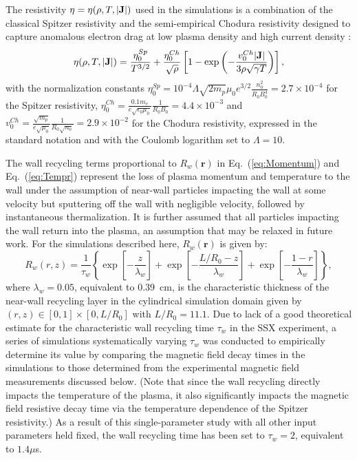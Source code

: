 The resistivity $\eta=\eta(\rho,T,|\mathbf{J}|)$ used in the simulations is a combination of the classical Spitzer resistivity and the semi-empirical Chodura resistivity designed to capture anomalous electron drag at low plasma density and high current density \cite{Chodura75,Sgro76,Meier11}:
\begin{equation}
\eta(\rho,T,|\mathbf{J}|) = \frac{\eta_0^{Sp}}{T^{3/2}} + \frac{\eta_0^{Ch}}{\sqrt{\rho}}\left[1 - \exp\left(-\frac{v_0^{Ch}|\mathbf{J}|}{3\rho\sqrt{\gamma T}}\right)\right],
\end{equation}
with the normalization constants $\eta_0^{Sp} = 10^{-4}\Lambda\sqrt{2 m_p}\mu_0 e^{3/2}\frac{n_0^2}{R_0 B_0^4} = 2.7\times 10^{-4}$ for the Spitzer resistivity, $\eta_0^{Ch} = \frac{0.1 m_e}{e\sqrt{\epsilon_0 \mu_0}}\frac{1}{R_0 B_0} = 4.4\times10^{-3}$ and $v_0^{Ch} = \frac{\sqrt{m_p}}{e\sqrt{\mu_0}}\frac{1}{R_0\sqrt{n_0}}=2.9\times10^{-2}$ for the Chodura resistivity, expressed in the standard notation and with the Coulomb logarithm set to $\Lambda=10$.
 
The wall recycling terms proportional to $R_w(\mathbf{r})$ in Eq.~(\ref{eq:Momentum}) and Eq.~(\ref{eq:Tempr}) represent the loss of plasma momentum and temperature to the wall under the assumption of near-wall particles impacting the wall at some velocity but sputtering off the wall with negligible velocity, followed by instantaneous thermalization.  It is further assumed that all particles impacting the wall return into the plasma, an assumption that may be relaxed in future work.  For the simulations described here, $R_w(\mathbf{r})$ is given by:
\begin{equation} 
R_w(r,z) = \frac{1}{\tau_w}\left\{\exp\left[-\frac{z}{\lambda_w}\right] + \exp\left[-\frac{L/R_0 - z}{\lambda_w}\right] + \exp\left[-\frac{1-r}{\lambda_w}\right]\right\},
\end{equation}
where $\lambda_w= 0.05$, equivalent to 0.39~cm, is the characteristic thickness of the near-wall recycling layer in the cylindrical simulation domain given by $(r,z)\in [0,1]\times[0,L/R_0]$ with $L/R_0=11.1$.  Due to lack of a good theoretical estimate for the characteristic wall recycling time $\tau_w$ in the SSX experiment, a series of simulations systematically varying $\tau_w$ was conducted to empirically determine its value by comparing the magnetic field decay times in the simulations to those determined from the experimental magnetic field measurements discussed below.  (Note that since the wall recycling directly impacts the temperature of the plasma, it also significantly impacts the magnetic field resistive decay time via the temperature dependence of the Spitzer resistivity.)  As a result of this single-parameter study with all other input parameters held fixed, the wall recycling time has been set to $\tau_w=2$, equivalent to $1.4 \mu$s. 

